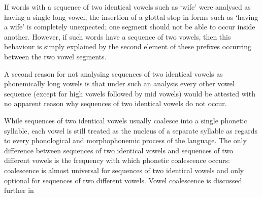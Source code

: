 \begin{exe}
	\label{ex1:NomCirInf}
\end{exe}

If words with a sequence of two identical vowels such as  `wife'
were analysed as having a single long vowel, the insertion of a glottal
stop in forms such as  `having a wife'
is completely unexpected; one segment should not be able to occur inside another.
However, if such words have a sequence of two vowels,
then this behaviour is simply explained by the second element of these prefixes
occurring between the two vowel segments.

A second reason for not analysing sequences of two identical
vowels as phonemically long vowels is that under such an analysis
every other vowel sequence (except for high vowels
followed by mid vowels) would be attested
with no apparent reason why sequences of two identical vowels do not occur.

While sequences of two identical vowels usually coalesce into a single
phonetic syllable, each vowel is still treated as the nucleus of a separate syllable
as regards to every phonological and morphophonemic process of the language.
The only difference between sequences of two identical vowels
and sequences of two different vowels is the frequency with which phonetic coalescence occurs:
coalescence is almost universal for sequences of two identical vowels
and only optional for sequences of two different vowels.
Vowel coalescence is discussed further in 

